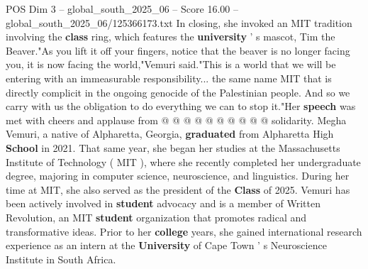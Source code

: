 \begin{textsample}{POS Dim 3 – global\_south\_2025\_06 – Score 16.00 – global\_south\_2025\_06/125366173.txt}
In closing, she invoked an MIT tradition involving the \textbf{class} ring, which features the \textbf{university} ' s mascot, Tim the Beaver."As you lift it off your fingers, notice that the beaver is no longer facing you, it is now facing the world,"Vemuri said."This is a world that we will be entering with an immeasurable responsibility... the same name MIT that is directly complicit in the ongoing genocide of the Palestinian people.
And so we carry with us the obligation to do everything we can to stop it."Her \textbf{speech} was met with cheers and applause from @ @ @ @ @ @ @ @ @ @ solidarity.
Megha Vemuri, a native of Alpharetta, Georgia, \textbf{graduated} from Alpharetta High \textbf{School} in 2021.
That same year, she began her studies at the Massachusetts Institute of Technology ( MIT ), where she recently completed her undergraduate degree, majoring in computer science, neuroscience, and linguistics.
During her time at MIT, she also served as the president of the \textbf{Class} of 2025.
Vemuri has been actively involved in \textbf{student} advocacy and is a member of Written Revolution, an MIT \textbf{student} organization that promotes radical and transformative ideas.
Prior to her \textbf{college} years, she gained international research experience as an intern at the \textbf{University} of Cape Town ' s Neuroscience Institute in South Africa.

\end{textsample}
